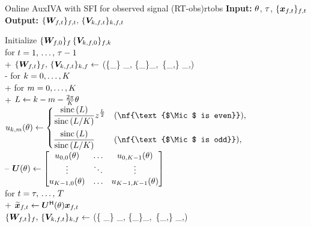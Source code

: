 \documentclass[sip,biber]{now-journal}
\begin{document}
\begin{algorithm}{Online AuxIVA with SFI for observed signal (RT-obs)}{rtobs}
  \textbf{Input:} $\theta$, $\tau$, $\{\Obs _{\ft}\} _{\ft}$ \\
  \textbf{Output:} $\{\Demix _{\ft}\}_{\ft},\, \{\cov _{\src,\ft}\}_{\src,\ft}$
  \begin{pseudo}
    Initialize $\{\bm{W} _{f,0}\} _{f} \, \{\bm{V} _{k,f,0}\} _{f,k}$ \\
    for $t = 1,\, \dots,\, \tau - 1$ \\+
      $\{\Demix _{\ft}\}_{\freq},\, \{\cov _{\src,\ft}\} _{\src,\freq} \gets$ (\{\Obs _{\ft}\} _{\freq}, \{\Demix _{\ft[-1]}\}_{\freq},\, \{\cov _{\src,\ft[-1]}\} _{\src,\freq}) \\-
    for $k = 0, \dots, K$ \\+
      for $m = 0, \dots, K$ \\+
        $L \gets k - m - \frac{2\pi}{K} \theta$ \\
        $\rotmat _{\src,\mic}(\rotSpat) \gets
          \begin{cases}
            \displaystyle \frac{\sinc{(\rotIdx)}}{\sinc{\left(\rotIdx / \Mic\right)}} \twid ^{\frac{\rotIdx}{2}} & (\nf{\text{$\Mic$ is even}}),\\[1em]
            \displaystyle \frac{\sinc{(\rotIdx)}}{\sinc{\left(\rotIdx / \Mic\right)}} & (\nf{\text{$\Mic$ is odd}}),
          \end{cases}
        $ \ct{\eqref{eq:rot:sinc}} \\--
    $\bm{U} (\theta) \gets
      \begin{bmatrix}
        u _{0, 0}(\theta) & \dots & u _{0, K - 1}(\theta) \\
        \vdots & \ddots & \vdots \\
        u _{K - 1, 0}(\theta) & \dots & u _{K - 1, K - 1}(\theta)
      \end{bmatrix}
      $ \ct{\eqref{eq:rotmat}} \\
    for $t = \tau,\, \dots,\, T$ \\+
      $\refpos{\Obs} _{\ft} \gets \rotMat ^{\hermite} (\rotSpat) \Obs _{\ft}$ \ct{$(\forall \freq)$} \\
      $\{\Demix _{\ft}\}_{\freq},\, \{\cov _{\src,\ft}\} _{\src,\freq} \gets$ (\{ _{\ft}\} _{\freq}, \{\Demix _{\ft[-1]}\}_{\freq},\, \{\cov _{\src,\ft[-1]}\} _{\src,\freq})
  \end{pseudo}
\end{algorithm}
\end{document}
